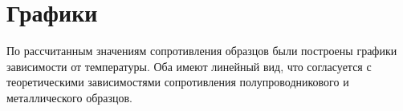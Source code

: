 \section{Графики}

\begin{figure}[H]
\begin{minipage}[h]{0.5\linewidth}
\end{minipage}
\begin{minipage}[h]{0.5\linewidth}
\end{minipage}
\end{figure}

По рассчитанным значениям сопротивления образцов были построены графики зависимости от температуры. Оба имеют линейный вид, что согласуется с теоретическими зависимостями сопротивления полупроводникового и металлического образцов.
